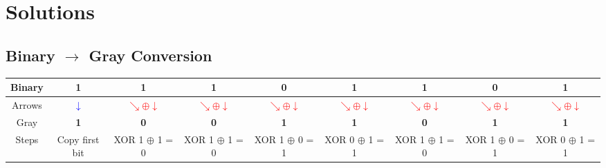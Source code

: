 



\section*{Solutions}

\subsection*{Binary $\to$ Gray Conversion}


\begin{center}
\renewcommand{\arraystretch}{1.3}
\begin{tabular}{|c|*8{c|}}
  \hline
    Binary &
    1 &    1 &    1 &    0 &    1 &    1 &    0 &    1  \\
  \hline

  Arrows &
      \textcolor{blue}{$\downarrow$} &
        \textcolor{red}{$\searrow \oplus \downarrow$} &        \textcolor{red}{$\searrow \oplus \downarrow$} &        \textcolor{red}{$\searrow \oplus \downarrow$} &        \textcolor{red}{$\searrow \oplus \downarrow$} &        \textcolor{red}{$\searrow \oplus \downarrow$} &        \textcolor{red}{$\searrow \oplus \downarrow$} &        \textcolor{red}{$\searrow \oplus \downarrow$}  \\
  \hline

    Gray &
    \textbf{ 1 } &    \textbf{ 0 } &    \textbf{ 0 } &    \textbf{ 1 } &    \textbf{ 1 } &    \textbf{ 0 } &    \textbf{ 1 } &    \textbf{ 1 }  \\
  \hline

  Steps &
    {\scriptsize Copy first bit } &    {\scriptsize XOR 1 $\oplus$ 1 = 0 } &    {\scriptsize XOR 1 $\oplus$ 1 = 0 } &    {\scriptsize XOR 1 $\oplus$ 0 = 1 } &    {\scriptsize XOR 0 $\oplus$ 1 = 1 } &    {\scriptsize XOR 1 $\oplus$ 1 = 0 } &    {\scriptsize XOR 1 $\oplus$ 0 = 1 } &    {\scriptsize XOR 0 $\oplus$ 1 = 1 }  \\
  \hline
\end{tabular}
\end{center}

\bigskip

